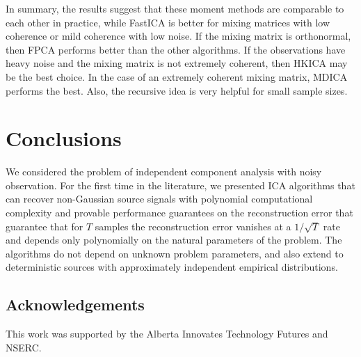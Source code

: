 \documentclass[twoside,11pt]{article}
\begin{document}
In summary, the results suggest that these moment methods are comparable to each other in practice,
while FastICA  is better for mixing matrices with low coherence or mild coherence with low noise.
If the mixing matrix is orthonormal, then FPCA performs better than
the other algorithms.
If the observations have heavy noise and the mixing matrix is not extremely coherent, then HKICA may be the best choice.
In the case of an extremely coherent mixing matrix, MDICA performs the
best. Also, the recursive idea is very helpful for small sample sizes.

\section{Conclusions}
We considered the problem of independent component analysis with noisy
observation. For the first time in the literature, we presented ICA algorithms that can recover non-Gaussian
source signals with polynomial computational complexity and provable performance guarantees on the reconstruction
error that guarantee that for $T$ samples the reconstruction error
vanishes at a $1/\sqrt{T}$ rate and depends only polynomially on the
natural parameters of the problem. The algorithms do not depend on
unknown problem parameters, and also extend to deterministic sources
with approximately independent empirical distributions.


\subsection*{Acknowledgements}

This work was supported by the Alberta Innovates Technology Futures
and NSERC.

\newpage 

%


\end{document}
